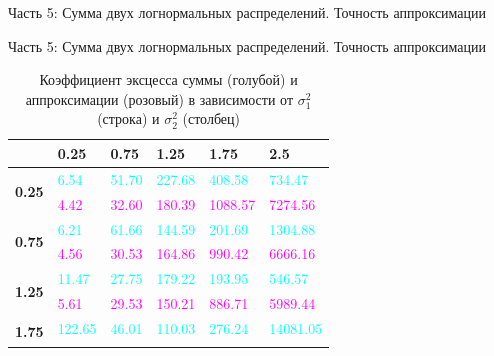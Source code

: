 \documentclass[ucs, notheorems, handout]{beamer}
\begin{document}
\begin{frame}{Часть 5: Сумма двух логнормальных распределений. Точность аппроксимации}
	\end{frame}
	
	\begin{frame}{Часть 5: Сумма двух логнормальных распределений. Точность аппроксимации}
		
		\begin{table}[]
			\centering
			\caption{Коэффициент эксцесса суммы (голубой) и аппроксимации (розовый) в зависимости от $\sigma_{1}^{2}$ (строка) и $\sigma_{2}^{2}$ (столбец) }
			\begin{tabular}{|c|l|l|l|l|l|}
				\hline
				& \textbf{0.25} & \textbf{0.75} & \textbf{1.25} & \textbf{1.75} & \textbf{2.5} \\ \hline
				\multirow{2}{*}{\textbf{0.25}} & \textcolor{cyan}{6.54}          & \textcolor{cyan}{51.70}         & \textcolor{cyan}{227.68}        & \textcolor{cyan}{408.58}        & \textcolor{cyan}{734.47}       \\ \cline{2-6} 
				& \textcolor{magenta}{4.42}          & \textcolor{magenta}{32.60}         & \textcolor{magenta}{180.39}        & \textcolor{magenta}{1088.57}       & \textcolor{magenta}{7274.56}      \\ \hline
				\multirow{2}{*}{\textbf{0.75}} & \textcolor{cyan}{6.21}          & \textcolor{cyan}{61.66}         & \textcolor{cyan}{144.59}        & \textcolor{cyan}{201.69}        & \textcolor{cyan}{1304.88}      \\ \cline{2-6} 
				& \textcolor{magenta}{4.56}          & \textcolor{magenta}{30.53}         & \textcolor{magenta}{164.86}        & \textcolor{magenta}{990.42}        & \textcolor{magenta}{6666.16}      \\ \hline
				\multirow{2}{*}{\textbf{1.25}} & \textcolor{cyan}{11.47}         & \textcolor{cyan}{27.75}         & \textcolor{cyan}{179.22}        & \textcolor{cyan}{193.95}        & \textcolor{cyan}{546.57}       \\ \cline{2-6} 
				& \textcolor{magenta}{5.61}          & \textcolor{magenta}{29.53}         & \textcolor{magenta}{150.21}        & \textcolor{magenta}{886.71}        & \textcolor{magenta}{5989.44}      \\ \hline
				\multirow{2}{*}{\textbf{1.75}} & \textcolor{cyan}{122.65}        & \textcolor{cyan}{46.01}         & \textcolor{cyan}{110.03}        & \textcolor{cyan}{276.24}        & \textcolor{cyan}{14081.05}     \\ \cline{2-6} 

\end{tabular}
\end{table}
\end{frame}
\end{document}

